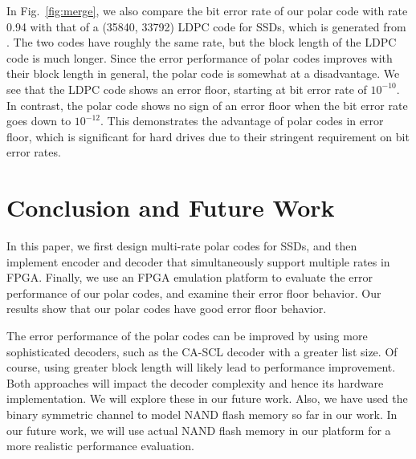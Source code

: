 \documentclass{article}
\begin{document}
In Fig.~\ref{fig:merge}, we also compare the bit error rate of our polar code with rate 0.94 with that of a (35840, 33792) LDPC code for SSDs, which is generated from \cite{zhang2015high}. The two codes have roughly the same rate, but the block length of the LDPC code is much longer. Since the error performance of polar codes improves with their block length in general, the polar code is somewhat at a disadvantage. We see that the LDPC code shows an error floor, starting at bit error rate of $10^{-10}$. In contrast, the polar code shows no sign of an error floor when the bit error rate goes down to $10^{-12}$. This demonstrates the advantage of polar codes in error floor, which is significant for hard drives due to their stringent requirement on bit error rates.






\section{Conclusion and Future Work}
\label{sec:conclusion}
In this paper, we first design multi-rate polar codes for SSDs, and then implement encoder and decoder that simultaneously support multiple rates in FPGA. Finally, we use an FPGA emulation platform to evaluate the error performance of our polar codes, and examine their error floor behavior. Our results show that our polar codes have good error floor behavior.

The error performance of the polar codes can be improved by using more sophisticated decoders, such as the CA-SCL decoder with a greater list size. Of course, using greater block length will likely lead to performance improvement. Both approaches will impact the decoder complexity and hence its hardware implementation. We will explore these in our future work. 
Also, we have used the binary symmetric channel to model NAND flash memory so far in our work. In our future work, we will use actual NAND flash memory in our platform for a more realistic performance evaluation.
\end{document}
